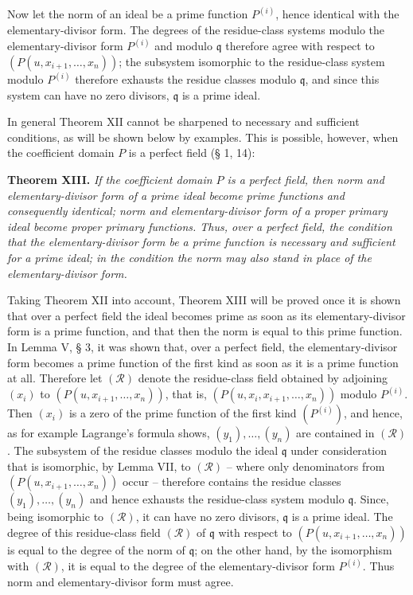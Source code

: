 \documentclass[11pt]{article}
\providecommand{\frakq}{\mathfrak q}
\begin{document}
Now let the norm of an ideal be a prime function $P^{(i)}$, hence identical with the elementary-divisor form. The degrees of the residue-class systems modulo the elementary-divisor form $P^{(i)}$ and modulo $\frakq$ therefore agree with respect to $(P(u,x_{i+1},\ldots,x_n))$; the subsystem isomorphic to the residue-class system modulo $P^{(i)}$ therefore exhausts the residue classes modulo $\frakq$, and since this system can have no zero divisors, $\frakq$ is a prime ideal.

In general Theorem XII cannot be sharpened to necessary and sufficient conditions, as will be shown below by examples. This is possible, however, when the coefficient domain $P$ is a perfect field (§ 1, 14):

\textbf{Theorem XIII.} \emph{If the coefficient domain $P$ is a perfect field, then norm and elementary-divisor form of a prime ideal become prime functions and consequently identical; norm and elementary-divisor form of a proper primary ideal become proper primary functions. Thus, over a perfect field, the condition that the elementary-divisor form be a prime function is necessary and sufficient for a prime ideal; in the condition the norm may also stand in place of the elementary-divisor form.}

Taking Theorem XII into account, Theorem XIII will be proved once it is shown that over a perfect field the ideal becomes prime as soon as its elementary-divisor form is a prime function, and that then the norm is equal to this prime function. In Lemma V, § 3, it was shown that, over a perfect field, the elementary-divisor form becomes a prime function of the first kind as soon as it is a prime function at all. Therefore let $(\mathcal R)$ denote the residue-class field obtained by adjoining $(x_i)$ to $(P(u,x_{i+1},\ldots,x_n))$, that is, $(P(u,x_i,x_{i+1},\ldots,x_n))$ modulo $P^{(i)}$. Then $(x_i)$ is a zero of the prime function of the first kind $(P^{(i)})$, and hence, as for example Lagrange's formula shows, $(y_1),\ldots,(y_n)$ are contained in $(\mathcal R)$. The subsystem of the residue classes modulo the ideal $\frakq$ under consideration that is isomorphic, by Lemma VII, to $(\mathcal R)$ -- where only denominators from $(P(u,x_{i+1},\ldots,x_n))$ occur -- therefore contains the residue classes $(y_1),\ldots,(y_n)$ and hence exhausts the residue-class system modulo $\frakq$. Since, being isomorphic to $(\mathcal R)$, it can have no zero divisors, $\frakq$ is a prime ideal. The degree of this residue-class field $(\mathcal R)$ of $\frakq$ with respect to $(P(u,x_{i+1},\ldots,x_n))$ is equal to the degree of the norm of $\frakq$; on the other hand, by the isomorphism with $(\mathcal R)$, it is equal to the degree of the elementary-divisor form $P^{(i)}$. Thus norm and elementary-divisor form must agree.
\end{document}
